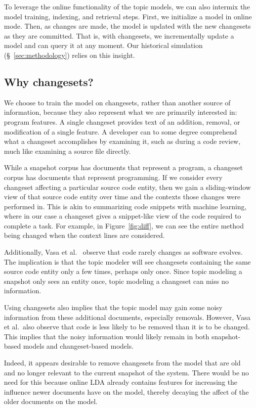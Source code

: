 To leverage the online functionality of the topic models, we can also intermix
the model training, indexing, and retrieval steps.  First, we initialize a model
in online mode.  Then, as changes are made, the model is updated with the new
changesets as they are committed.  That is, with changesets, we incrementally
update a model and can query it at any moment.  Our historical simulation
(\S~\ref{sec:methodology}) relies on this insight.



\subsection{Why changesets?}

We choose to train the model on changesets, rather than another source of
information, because they also represent what we are primarily interested in:
program features.  A single changeset provides text of an addition, removal, or
modification of a single feature.  A developer can to some degree comprehend
what a changeset accomplishes by examining it, such as during a code review,
much like examining a source file directly.

While a snapshot corpus has documents that represent a program, a changeset
corpus has documents that represent programming.  If we consider every changeset
affecting a particular source code entity, then we gain a sliding-window view of
that source code entity over time and the contexts those changes were performed
in.  This is akin to summarizing code snippets with machine
learning\cite{Ying-Robillard:2013}, where in our case a changeset gives
a snippet-like view of the code required to complete a task.  For example, in
Figure~\ref{fig:diff}, we can see the entire method being changed when the
context lines are considered.

Additionally, Vasa et al.~\cite{Vasa-etal:2007} observe that code rarely changes
as software evolves. The implication is that the topic modeler will see
changesets containing the same source code entity only a few times, perhaps only
once.  Since topic modeling a snapshot only sees an entity once, topic modeling
a changeset can miss no information.

Using changesets also implies that the topic model may gain some noisy
information from these additional documents, especially removals.  However, Vasa
et al.\ also observe that code is less likely to be removed than it is to be
changed. This implies that the noisy information would likely remain in both
snapshot-based models and changeset-based models.

Indeed, it appears desirable to remove changesets from the model that are old
and no longer relevant to the current snapshot of the system. There would be no
need for this because online LDA already contains features for increasing the
influence newer documents have on the model, thereby decaying the affect of the
older documents on the model.


